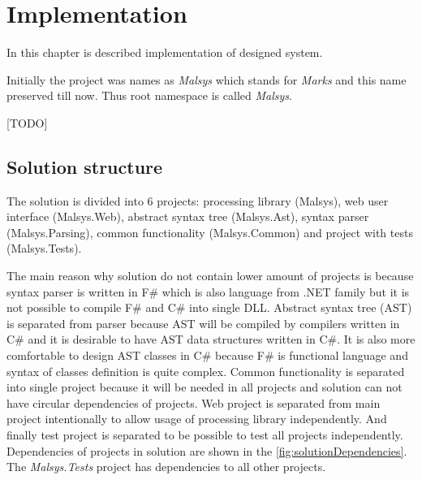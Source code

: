 
\chapter{Implementation}
\label{chap:implementation}

In this chapter is described implementation of designed system.

Initially the project was names as \emph{Malsys} which stands for \emph{Marks \lsystems} and this name preserved till now.
Thus root namespace is called \emph{Malsys}.

[TODO]




\section{Solution structure}

The solution is divided into 6 projects: \lsystem processing library (Malsys), web user interface (Malsys.Web), abstract syntax tree (Malsys.Ast), syntax parser (Malsys.Parsing), common functionality (Malsys.Common) and project with tests (Malsys.Tests).

The main reason why solution do not contain lower amount of projects is because syntax parser is written in F\# which is also language from .NET family but it is not possible to compile F\# and C\# into single DLL.
Abstract syntax tree (AST) is separated from parser because AST will be compiled by compilers written in C\# and it is desirable to have AST data structures written in C\#.
It is also more comfortable to design AST classes in C\# because F\# is functional language and syntax of classes definition is quite complex.
Common functionality is separated into single project because it will be needed in all projects and solution can not have circular dependencies of projects.
Web project is separated from main project intentionally to allow usage of \lsystem processing library independently.
And finally test project is separated to be possible to test all projects independently.
Dependencies of projects in solution are shown in the \autoref{fig:solutionDependencies}.
The \emph{Malsys.Tests} project has dependencies to all other projects.

